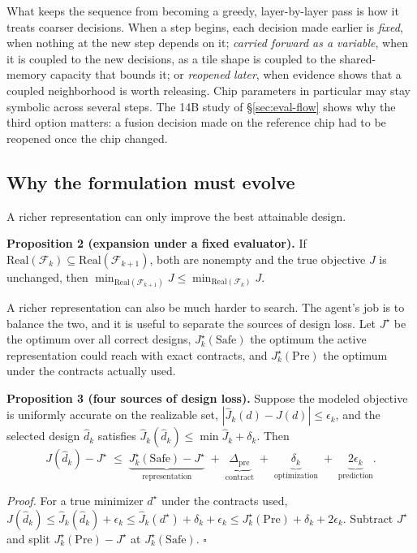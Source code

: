 \documentclass[11pt]{article}
\begin{document}
What keeps the sequence from becoming a greedy, layer-by-layer pass is how it treats coarser decisions. When a step begins, each decision made earlier is \emph{fixed}, when nothing at the new step depends on it; \emph{carried forward as a variable}, when it is coupled to the new decisions, as a tile shape is coupled to the shared-memory capacity that bounds it; or \emph{reopened later}, when evidence shows that a coupled neighborhood is worth releasing. Chip parameters in particular may stay symbolic across several steps. The 14B study of §\ref{sec:eval-flow} shows why the third option matters: a fusion decision made on the reference chip had to be reopened once the chip changed.

\subsection{Why the formulation must evolve}\label{sec:loss}

A richer representation can only improve the best attainable design.

\textbf{Proposition 2 (expansion under a fixed evaluator).} If \(\mathrm{Real}(\mathcal F_k)\subseteq\mathrm{Real}(\mathcal F_{k+1})\), both are nonempty and the true objective \(J\) is unchanged, then \(\min_{\mathrm{Real}(\mathcal F_{k+1})}J\le\min_{\mathrm{Real}(\mathcal F_k)}J\).

A richer representation can also be much harder to search. The agent's job is to balance the two, and it is useful to separate the sources of design loss. Let \(J^\star\) be the optimum over all correct designs, \(J^\star_k(\mathrm{Safe})\) the optimum the active representation could reach with exact contracts, and \(J^\star_k(\mathrm{Pre})\) the optimum under the contracts actually used.

\textbf{Proposition 3 (four sources of design loss).} Suppose the modeled objective is uniformly accurate on the realizable set, \(|\hat J_k(d)-J(d)|\le\epsilon_k\), and the selected design \(\hat d_k\) satisfies \(\hat J_k(\hat d_k)\le\min\hat J_k+\delta_k\). Then
\[
J(\hat d_k)-J^\star\;\le\;\underbrace{J^\star_k(\mathrm{Safe})-J^\star}_{\text{representation}}\;+\;\underbrace{\Delta_{\mathrm{pre}}}_{\text{contract}}\;+\;\underbrace{\delta_k}_{\text{optimization}}\;+\;\underbrace{2\epsilon_k}_{\text{prediction}}.
\]

\emph{Proof.} For a true minimizer \(d^\star\) under the contracts used, \(J(\hat d_k)\le\hat J_k(\hat d_k)+\epsilon_k\le\hat J_k(d^\star)+\delta_k+\epsilon_k\le J^\star_k(\mathrm{Pre})+\delta_k+2\epsilon_k\). Subtract \(J^\star\) and split \(J^\star_k(\mathrm{Pre})-J^\star\) at \(J^\star_k(\mathrm{Safe})\). \(\square\)
\end{document}

